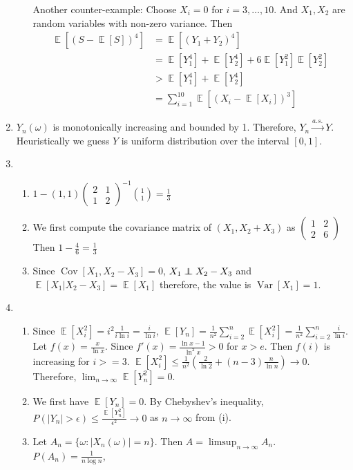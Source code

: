 \documentclass{article}
\DeclareMathOperator{\E}{\mathbb{E}}
\DeclareMathOperator{\Cov}{Cov}
\DeclareMathOperator{\Var}{Var}
\newcommand\independent{\protect\mathpalette{\protect\independenT}{\perp}}
\def\independenT#1#2{\mathrel{\rlap{$#1#2$}\mkern2mu{#1#2}}}
\begin{document}
\begin{enumerate}
\begin{enumerate}
    Another counter-example: Choose $X_i=0$ for $i=3,\dots, 10$.
    And $X_1, X_2$ are random variables with non-zero variance.
    Then
    \begin{align*}
        \E[(S-\E[S])^4] & = \E[(Y_1 + Y_2)^4] \\
        &=\E[Y_1^4] + \E[Y_2^4] + 6\E[Y_1^2]\E[Y_2^2]\\
        &>\E[Y_1^4] + \E[Y_2^4] \\
        &=\sum_{i=1}^{10} \E[(X_i-\E[X_i])^3]
    \end{align*}
\end{enumerate}
\item $Y_n(\omega)$ is monotonically increasing and bounded by 1.
Therefore, $Y_n \xrightarrow{a.s.} Y$. Heuristically we guess $Y$ is uniform distribution
over the interval $[0,1]$.
\item \begin{enumerate}
    \item $1 - (1,1)\begin{pmatrix}2&1\\1&2\end{pmatrix}^{-1}\binom{1}{1}= \frac{1}{3}$
    \item  We first compute the covariance matrix of $(X_1, X_2+X_3) $ as 
    $\begin{pmatrix}1&2\\2&6\end{pmatrix}$
    Then $1-\frac{4}{6}=
    \frac{1}{3}$
    \item Since $\Cov[X_1,X_2-X_3]=0$, $X_1 \independent X_2-X_3$
    and $\E[X_1|X_2-X_3]=\E[X_1]$ therefore, the value is $\Var[X_1]=1$.
\end{enumerate}
\item 
\begin{enumerate}[label=(\roman*)]
    \item Since $\E[X_i^2]=i^2\frac{1}{i\ln i}=\frac{i}{\ln i}$, $\E[Y_n]=\frac{1}{n^2}\sum_{i=2}^n \E[X_i^2]=\frac{1}{n^2}\sum_{i=2}^n \frac{i}{\ln i}$.
    Let $f(x)=\frac{x}{\ln x}$. Since $f'(x)=\frac{\ln x - 1}{\ln^2 x} > 0$ for $x>e$. Then $f(i)$ is increasing for $i>=3$.
    $\E[X_i^2]\leq \frac{1}{n^2}(\frac{2}{\ln 2} + (n-3)\frac{n}{\ln n}) \to 0$.
    Therefore, $\lim_{n\to\infty}\E[Y^2_n] = 0$.
    \item We first have $\E[Y_n]=0$. By Chebyshev's inequality,
    $P(|Y_n|>\epsilon)\leq \frac{\E[Y_n^2]}{\epsilon^2} \to 0$ as $n\to\infty$
    from (i).
    \item Let $A_n=\{\omega: |X_n(\omega)|=n\}$. Then $A = \limsup_{n\to\infty}A_n $. $P(A_n) = \frac{1}{n\log n}$,

\end{enumerate}
\end{enumerate}
\end{document}
